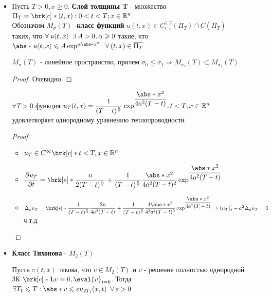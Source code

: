   
\begin{itemize}
\item Пусть $T > 0, \sigma \geq 0$. {\bf Слой толщины T} - множество $\Pi_T =\brk[c]*{(t,x): 0 < t < T; x \in \R^n}$\\
Обозначим $M_\sigma(T)$ -{\bf класс функций} $u(t,x) \in C^{1,2}_{t,x}(\Pi_T) \cap
C(\overline{\Pi_T})$ таких, что $\forall\: u(t,x) \;\;\exists\: A > 0 , \alpha \geqslant 0$ такие,
что $\abs*{u(t,x)} \leq A\exp^{\alpha \abs*{x}^{\sigma}} \Forall (t,x) \in \overline{\Pi_T}$


\begin{lemma}
$M_\sigma(T)$ - линейное пространство, причем 
$\sigma_0 \leq \sigma_1 \Rightarrow M_{\sigma_0}(T) \subset M_{\sigma_1}(T)$
\begin{proof}
Очевидно.
\end{proof}
\end{lemma}

\begin{lemma}
$\forall T > 0$ функция $u_T(t,x) = \dfrac{1}{(T-t)^{\frac{n}{2}}}
\exp^{\dfrac{\abs*{x}^2}{4a^2(T-t)}}, t<T, x \in \R^n$ удовлетворяет
 однородному уравнению теплопроводности
\begin{proof}
\begin{itemize}

\item $u_T \in C^\infty \brk[c]*{t<T, x \in \R^n}$

\item $\pd{u_T}{t} = \brk[s]*{\dfrac{n}{2(T-t)^\frac{n}{2}} + \dfrac{1}{(T-
t)^{\frac{n}{2}}}{\dfrac{\abs*{x}^2}{4a^2(T-t)^2}}}
\exp^{\dfrac{\abs*{x}^2}{4a^2(T-t)}}$

\item $\Delta_xu_T = \brk[s]*{\dfrac{1}{(T-t)^\frac{n}
{2}}\dfrac{2n}{4a^2(T-t)} + \dfrac{1}{(T-t)^\frac{n}
{2}}\dfrac{4\abs*{x}^2}{4^2a^4(T-t)^{2}}}
\exp^{\dfrac{\abs*{x}^2}{4a^2(T-t)}} \Rightarrow 
(u_T)^{'}_t - a^2 \Delta_x u_T = 0$ ч.т.д
\end{itemize}
\end{proof}
\end{lemma}


\item {\bf Класс Тихонова} - $M_2(T)$

\begin{lemma}
Пусть $v(t,x)$ такова, что $v \in M_2(T)$ и $v$ - решение полностью 
однородной ЗК $\brk[c]*{\mathrm{L}v = 0, \eval{v}_{t=0}}$.
Тогда $\exists T_1 \leq T: \abs*{v} \leq \varepsilon u_{2T_1}(x,t) \Forall \varepsilon > 0$


\end{lemma}
\end{itemize}

